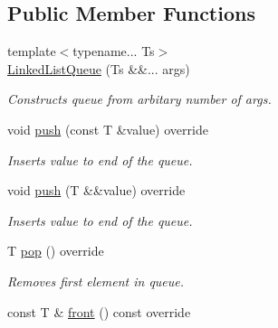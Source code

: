 \subsection*{Public Member Functions}
\begin{DoxyCompactItemize}
\item 
{\footnotesize template$<$typename... Ts$>$ }\\\hyperlink{classlab_1_1impl_1_1LinkedListQueue_a6fbacc0f7c5c741b048326c73b761b36}{Linked\+List\+Queue} (Ts \&\&... args)
\begin{DoxyCompactList}\small\item\em Constructs queue from arbitary number of args. \end{DoxyCompactList}\item 
\mbox{\label{classlab_1_1impl_1_1LinkedListQueue_a634f14f772cb0d9ce0a9a60a5cd81405}} 
void \hyperlink{classlab_1_1impl_1_1LinkedListQueue_a634f14f772cb0d9ce0a9a60a5cd81405}{push} (const T \&value) override
\begin{DoxyCompactList}\small\item\em Inserts value to end of the queue. \end{DoxyCompactList}\item 
\mbox{\label{classlab_1_1impl_1_1LinkedListQueue_a0d57b7b5ab370206ac3e0da143c70d50}} 
void \hyperlink{classlab_1_1impl_1_1LinkedListQueue_a0d57b7b5ab370206ac3e0da143c70d50}{push} (T \&\&value) override
\begin{DoxyCompactList}\small\item\em Inserts value to end of the queue. \end{DoxyCompactList}\item 
\mbox{\label{classlab_1_1impl_1_1LinkedListQueue_a79a798c1277bb38a085f5f5f00f22cc3}} 
T \hyperlink{classlab_1_1impl_1_1LinkedListQueue_a79a798c1277bb38a085f5f5f00f22cc3}{pop} () override
\begin{DoxyCompactList}\small\item\em Removes first element in queue. \end{DoxyCompactList}\item 
\mbox{\label{classlab_1_1impl_1_1LinkedListQueue_ae2e4c57fbf4668aa7a2a9360d7dad1fc}} 
const T \& \hyperlink{classlab_1_1impl_1_1LinkedListQueue_ae2e4c57fbf4668aa7a2a9360d7dad1fc}{front} () const override

\end{DoxyCompactItemize}
